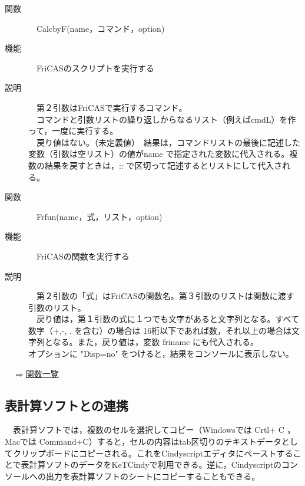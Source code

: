 \documentclass[papersize,a4paper,12pt,uplatex]{jsarticle}
\begin{document}
\begin{description}

\hypertarget{calcbyF}{}
\item[関数]　CalcbyF(name，コマンド，option)
\item[機能]　FriCASのスクリプトを実行する
\item[説明]　第２引数はFriCASで実行するコマンド。\\
　コマンドと引数リストの繰り返しからなるリスト（例えばcmdL）を作って，一度に実行する。\\
　戻り値はない。（未定義値）　結果は，コマンドリストの最後に記述した変数（引数は空リスト）の値がname で指定された変数に代入される。複数の結果を戻すときは，:: で区切って記述するとリストにして代入される。\\

\hypertarget{frfun}{}
\item[関数]　Frfun(name，式，リスト，option)
\item[機能]　FriCASの関数を実行する
\item[説明]　第２引数の「式」はFriCASの関数名。第３引数のリストは関数に渡す引数のリスト。\\
　戻り値は，第１引数の式に１つでも文字があると文字列となる。すべて数字（+,-, . を含む）の場合は
16桁以下であれば数，それ以上の場合は文字列となる。また，戻り値は，変数 friname にも代入される。\\
オプションに "Disp=no" をつけると，結果をコンソールに表示しない。\\

\end{description}
\begin{flushright}　\hyperlink{functionlist}{$\Rightarrow$関数一覧}\end{flushright}

\newpage
\subsection{表計算ソフトとの連携}
　表計算ソフトでは，複数のセルを選択してコピー（Windowsでは Crtl+ C ，Macでは Command+C）すると，セルの内容はtab区切りのテキストデータとしてクリップボードにコピーされる。これをCindyscriptエディタにペーストすることで表計算ソフトのデータをKeTCindyで利用できる。逆に，Cindyscriptのコンソールへの出力を表計算ソフトのシートにコピーすることもできる。
\end{document}
